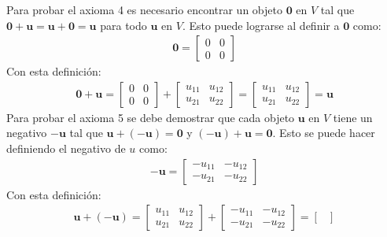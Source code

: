 \documentclass[a4paper,12pt]{article}
\begin{document}
\begin{enumerate}[\textsc{Ejemplo} 1:, wide=\parindent]
    Para probar el axioma 4 es necesario encontrar un objeto $\mathbf{0}$ en
    $V$ tal que $\mathbf{0}+\mathbf{u}=\mathbf{u}+\mathbf{0}=\mathbf{u}$ para
    todo $\mathbf{u}$ en $V$. Esto puede lograrse al definir a $\mathbf{0}$
    como:
    \begin{align*}
      \mathbf{0}=
      \begin{bmatrix}
        0&0\\
        0&0
      \end{bmatrix}
    \end{align*}
    Con esta definición:
    \begin{align*}
      \mathbf{0}+\mathbf{u}=
      \begin{bmatrix}
        0 & 0 \\
        0 & 0
      \end{bmatrix}
      +
      \begin{bmatrix}
        u_{11} & u_{12} \\
        u_{21} & u_{22}
      \end{bmatrix}
      =
      \begin{bmatrix}
        u_{11} & u_{12} \\
        u_{21} & u_{22}
      \end{bmatrix}
      = \mathbf{u}
    \end{align*}
    Para probar el axioma 5 se debe demostrar que cada objeto $\mathbf{u}$
    en $V$ tiene un negativo $-\mathbf{u}$ tal que
    $\mathbf{u}+(-\mathbf{u})=\mathbf{0}$ y
    $(-\mathbf{u})+\mathbf{u}=\mathbf{0}$. Esto se puede hacer definiendo el
    negativo de $u$ como:
    \begin{align*}
      -\mathbf{u}=
      \begin{bmatrix}
        -u_{11} & -u_{12} \\
        -u_{21} & -u_{22}
      \end{bmatrix}
    \end{align*}
    Con esta definición:
    \begin{align*}
      \mathbf{u}+(-\mathbf{u})=
      \begin{bmatrix}
        u_{11} & u_{12} \\
        u_{21} & u_{22}
      \end{bmatrix}
      +
      \begin{bmatrix}
        -u_{11} & -u_{12} \\
        -u_{21} & -u_{22}
      \end{bmatrix}
      =
      \begin{bmatrix}

\end{bmatrix}
\end{align*}
\end{enumerate}
\end{document}
